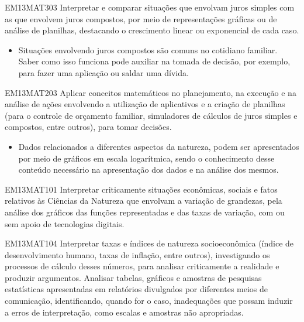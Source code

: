 \begin{apresentacao}
\begin{habilities}{EM13MAT303}
Interpretar e comparar situações que envolvam juros simples com as que envolvem juros compostos, por meio de representações gráficas ou de análise de planilhas, destacando o crescimento linear ou exponencial de cada caso.
\end{habilities}

\begin{itemize}
\item Situações envolvendo juros compostos são comuns no cotidiano familiar. Saber como isso funciona pode auxiliar na tomada de decisão, por exemplo, para fazer uma aplicação ou saldar uma dívida.
\end{itemize}

\begin{habilities}{EM13MAT203}
Aplicar conceitos matemáticos no planejamento, na execução e na análise de ações envolvendo a utilização de aplicativos e a criação de planilhas (para o controle de orçamento familiar, simuladores de cálculos de juros simples e compostos, entre outros), para tomar decisões.
\end{habilities}

\begin{itemize}
\item Dados relacionados a diferentes aspectos da natureza, podem ser apresentados por meio de gráficos em escala logarítmica, sendo o conhecimento desse conteúdo necessário na apresentação dos dados e na análise dos mesmos.
\end{itemize}

\begin{habilities}{EM13MAT101}
Interpretar criticamente situações econômicas, sociais e fatos relativos às Ciências da Natureza que envolvam a variação de grandezas, pela análise dos gráficos das funções representadas e das taxas de variação, com ou sem apoio de tecnologias digitais.
\end{habilities}

\begin{habilities}{EM13MAT104}
Interpretar taxas e índices de natureza socioeconômica (índice de desenvolvimento humano, taxas de inflação, entre outros), investigando os processos de cálculo desses números, para analisar criticamente a realidade e produzir argumentos.
 Analisar tabelas, gráficos e amostras de pesquisas estatísticas apresentadas em relatórios divulgados por diferentes meios de comunicação, identificando, quando for o caso, inadequações que possam induzir a erros de interpretação, como escalas e amostras não apropriadas.
\end{habilities}




\end{apresentacao}
